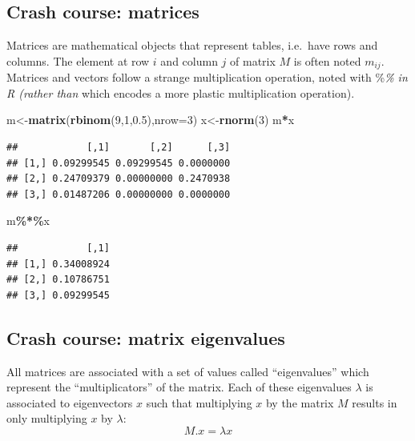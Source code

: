 \documentclass[
]{book}
\newenvironment{Shaded}{\begin{snugshade}}{\end{snugshade}}
\newcommand{\AttributeTok}[1]{\textcolor[rgb]{0.13,0.29,0.53}{#1}}
\newcommand{\DecValTok}[1]{\textcolor[rgb]{0.00,0.00,0.81}{#1}}
\newcommand{\FloatTok}[1]{\textcolor[rgb]{0.00,0.00,0.81}{#1}}
\newcommand{\FunctionTok}[1]{\textcolor[rgb]{0.13,0.29,0.53}{\textbf{#1}}}
\newcommand{\NormalTok}[1]{#1}
\newcommand{\OtherTok}[1]{\textcolor[rgb]{0.56,0.35,0.01}{#1}}
\newcommand{\SpecialCharTok}[1]{\textcolor[rgb]{0.81,0.36,0.00}{\textbf{#1}}}
\theoremstyle{definition}
\theoremstyle{definition}
\theoremstyle{definition}
\theoremstyle{definition}
\theoremstyle{remark}
\begin{document}
\subsection{Crash course: matrices}\label{crash-course-matrices}

Matrices are mathematical objects that represent tables, i.e.~have rows and columns. The element at row \(i\) and column \(j\) of matrix \(M\) is often noted \(m_{ij}\).
Matrices and vectors follow a strange multiplication operation, noted with \%\emph{\% in R (rather than } which encodes a more plastic multiplication operation).

\begin{Shaded}
\begin{Highlighting}[]
\NormalTok{m}\OtherTok{\textless{}{-}}\FunctionTok{matrix}\NormalTok{(}\FunctionTok{rbinom}\NormalTok{(}\DecValTok{9}\NormalTok{,}\DecValTok{1}\NormalTok{,}\FloatTok{0.5}\NormalTok{),}\AttributeTok{nrow=}\DecValTok{3}\NormalTok{)}
\NormalTok{x}\OtherTok{\textless{}{-}}\FunctionTok{rnorm}\NormalTok{(}\DecValTok{3}\NormalTok{)}
\NormalTok{m}\SpecialCharTok{*}\NormalTok{x}
\end{Highlighting}
\end{Shaded}

\begin{verbatim}
##            [,1]       [,2]      [,3]
## [1,] 0.09299545 0.09299545 0.0000000
## [2,] 0.24709379 0.00000000 0.2470938
## [3,] 0.01487206 0.00000000 0.0000000
\end{verbatim}

\begin{Shaded}
\begin{Highlighting}[]
\NormalTok{m}\SpecialCharTok{\%*\%}\NormalTok{x}
\end{Highlighting}
\end{Shaded}

\begin{verbatim}
##            [,1]
## [1,] 0.34008924
## [2,] 0.10786751
## [3,] 0.09299545
\end{verbatim}

\subsection{Crash course: matrix eigenvalues}\label{crash-course-matrix-eigenvalues}

All matrices are associated with a set of values called ``eigenvalues'' which represent the ``multiplicators'' of the matrix. Each of these eigenvalues \(\lambda\) is associated to eigenvectors \(x\) such that multiplying \(x\) by the matrix \(M\) results in only multiplying \(x\) by \(\lambda\):
\[M.x = \lambda x\]
\end{document}
